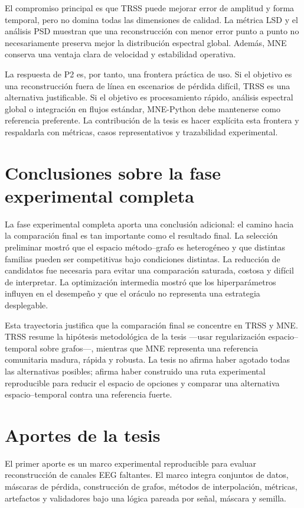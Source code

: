 El compromiso principal es que TRSS puede mejorar error de amplitud y forma temporal, pero no domina todas las dimensiones de calidad. La métrica LSD y el análisis PSD muestran que una reconstrucción con menor error punto a punto no necesariamente preserva mejor la distribución espectral global. Además, MNE conserva una ventaja clara de velocidad y estabilidad operativa.

La respuesta de P2 es, por tanto, una frontera práctica de uso. Si el objetivo es una reconstrucción fuera de línea en escenarios de pérdida difícil, TRSS es una alternativa justificable. Si el objetivo es procesamiento rápido, análisis espectral global o integración en flujos estándar, MNE-Python debe mantenerse como referencia preferente. La contribución de la tesis es hacer explícita esta frontera y respaldarla con métricas, casos representativos y trazabilidad experimental.

\section{Conclusiones sobre la fase experimental completa}

La fase experimental completa aporta una conclusión adicional: el camino hacia la comparación final es tan importante como el resultado final. La selección preliminar mostró que el espacio método--grafo es heterogéneo y que distintas familias pueden ser competitivas bajo condiciones distintas. La reducción de candidatos fue necesaria para evitar una comparación saturada, costosa y difícil de interpretar. La optimización intermedia mostró que los hiperparámetros influyen en el desempeño y que el oráculo no representa una estrategia desplegable.

Esta trayectoria justifica que la comparación final se concentre en TRSS y MNE. TRSS resume la hipótesis metodológica de la tesis —usar regularización espacio--temporal sobre grafos—, mientras que MNE representa una referencia comunitaria madura, rápida y robusta. La tesis no afirma haber agotado todas las alternativas posibles; afirma haber construido una ruta experimental reproducible para reducir el espacio de opciones y comparar una alternativa espacio--temporal contra una referencia fuerte.

\section{Aportes de la tesis}

El primer aporte es un marco experimental reproducible para evaluar reconstrucción de canales EEG faltantes. El marco integra conjuntos de datos, máscaras de pérdida, construcción de grafos, métodos de interpolación, métricas, artefactos y validadores bajo una lógica pareada por señal, máscara y semilla.

